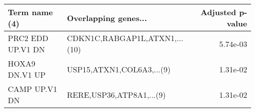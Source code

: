 \begin{tabular}{llr}
\toprule
    Term name (4) &          Overlapping genes... &  Adjusted p-value \\
\midrule
PRC2 EDD UP.V1 DN & CDKN1C,RABGAP1L,ATXN1,...(10) &          5.74e-03 \\
   HOXA9 DN.V1 UP &     USP15,ATXN1,COL6A3,...(9) &          1.31e-02 \\
    CAMP UP.V1 DN &      RERE,USP36,ATP8A1,...(9) &          1.31e-02 \\
\bottomrule
\end{tabular}
